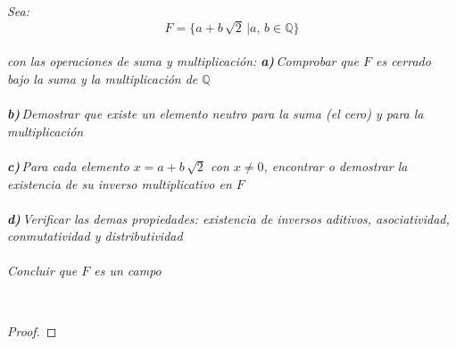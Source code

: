 \documentclass[11pt,letterpaper]{article}
\begin{document}
\begin{tcolorbox}[
	title = \textcolor{black}{\textcolor{white}{Problema 3}},]
\textit{Sea:\,\\
\begin{equation*}
    F=\{a+b\,\sqrt{2}\,|a,\,b\in \mathbb{Q}\}
\end{equation*}\,\\
con las operaciones de suma y multiplicaci\'on:
\textbf{a)}\,Comprobar que $F$ es cerrado bajo la suma y la multiplicaci\'on de $\mathbb{Q}$\,\\
\,\\
\textbf{b)}\,Demostrar que existe un elemento neutro para la suma (el cero) y para la multiplicaci\'on\,\\
\,\\
\textbf{c)}\,Para cada elemento $x=a+b\,\sqrt{2}$ con $x\neq 0$, encontrar o demostrar la existencia de su inverso multiplicativo
en $F$\,\\
\,\\
\textbf{d)}\,Verificar las demas propiedades: existencia de inversos aditivos, asociatividad, conmutatividad y distributividad\,\\
\,\\
Concluir que $F$ es un campo
}
\end{tcolorbox}\,\\
\begin{proof}
    
\end{proof}\,\\
\end{document}
